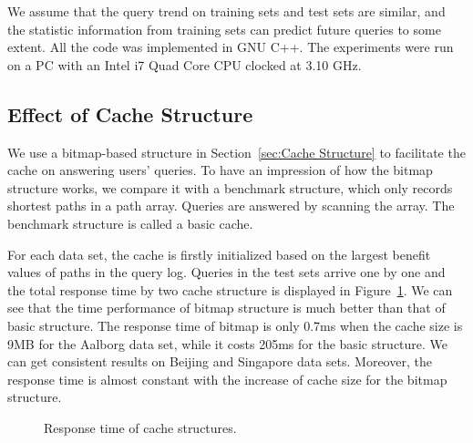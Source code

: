 We assume that the query trend on training sets and test sets are similar, and the statistic information from training sets can predict future queries to some extent. All the code was implemented in GNU C++. The experiments were run on a PC with an Intel i7 Quad Core CPU clocked at 3.10 GHz.

\subsection{Effect of Cache Structure}
\label{sec:effect-cache-structure}
We use a bitmap-based structure in Section~\ref{sec:Cache Structure} to facilitate the cache on answering users' queries.
To have an impression of how the bitmap structure works, we compare it with a benchmark structure, which only records shortest paths in a path array.
Queries are answered by scanning the array.
The benchmark structure is called a basic cache.

For each data set, the cache is firstly initialized based on the largest benefit values of paths in the query log. Queries in the test sets arrive one by one and the total response time by two cache structure is displayed in Figure~\ref{fig:time-cache-structure}. We can see that the time performance of bitmap structure is much better than that of basic structure. The response time of bitmap is only 0.7ms when the cache size is 9MB for the Aalborg data set, while it costs 205ms for the basic structure. We can get consistent results on Beijing and Singapore data sets.
Moreover, the response time is almost constant with the increase of cache size for the bitmap structure.
\begin{figure}[htbp]
\centering
 \caption{Response time of cache structures.}
 \label{fig:time-cache-structure}
\end{figure}



